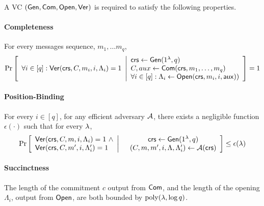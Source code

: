 \begin{definition} \label{def:VC}
A VC $(\mathsf{Gen}, \mathsf{Com}, \mathsf{Open}, \mathsf{Ver})$ is required to satisfy the following properties.
\paragraph{Completeness}

For every messages sequence, $m_1,\ldots m_q$,
\begin{gather*}
    \underset{}{\text{Pr}}\left [
    \begin{array}{ll}
    \forall i\in [q]: 
         \mathsf{Ver}(\mathsf{crs}, C, m_i, i, \Lambda_i) = 1
    \end{array}
    \middle\vert
    \begin{array}{ll}
         \mathsf{crs} \leftarrow \mathsf{Gen}(1^\lambda, q)\\
         C, aux\leftarrow\mathsf{Com}(\mathsf{crs}, m_1,\ldots,m_q) \\
         \forall i\in [q]: \Lambda_i \leftarrow \mathsf{Open}(\mathsf{crs}, m_i, i, \mathsf{aux}))
    \end{array}
    \right ] = 1
\end{gather*}
\paragraph{Position-Binding} For every $i\in [q]$, for any efficient adversary $\mathcal{A}$, there exists a negligible function $\epsilon(\cdot)$ such that for every $\lambda$, %
\begin{gather*}
    \underset{}{\text{Pr}}\left [
    \begin{array}{ll}
    \mathsf{Ver}(\mathsf{crs}, C, m, i, \Lambda_i) = 1 \ \wedge \\
    \mathsf{Ver}(\mathsf{crs}, C, m', i, \Lambda_i') = 1
    \end{array}
    \middle\vert
    \begin{array}{cc}
         &  \mathsf{crs} \leftarrow \mathsf{Gen}(1^\lambda, q)\\
         & (C, m, m', i, \Lambda, \Lambda_i')\leftarrow\mathcal{A}(\mathsf{crs})
    \end{array}
    \right ] \leq \epsilon(\lambda)
\end{gather*}

\paragraph{Succinctness}
The length of the commitment $c$ output from $\mathsf{Com}$, and the length of the opening $\Lambda_i$, output from $\mathsf{Open}$, are both bounded by $\operatorname{poly}(\lambda, \log q)$.
\end{definition}


